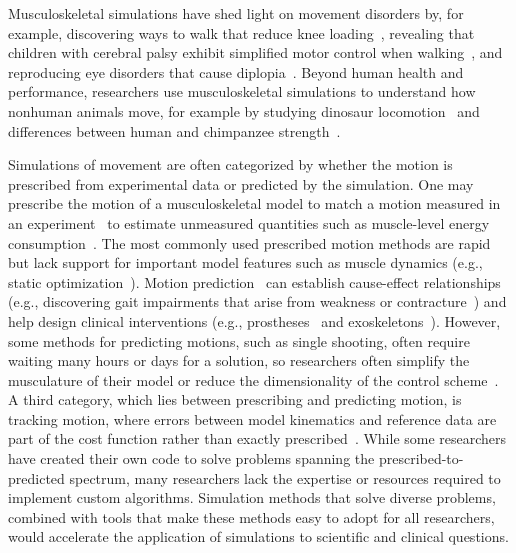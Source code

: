 \documentclass[10pt,letterpaper]{article}
\begin{document}
Musculoskeletal simulations have shed light on movement disorders by, for example, discovering ways to walk that reduce knee loading~\cite{Fregly:2007ac}, revealing that children with cerebral palsy exhibit simplified motor control when walking~\cite{Steele:2015}, and reproducing eye disorders that cause diplopia~\cite{Priamikov:2016}. Beyond human health and performance, researchers use musculoskeletal simulations to understand how nonhuman animals move, for example by studying dinosaur locomotion~\cite{sthaya:2005uk} and differences between human and chimpanzee strength~\cite{ONeill:2017}.

Simulations of movement are often categorized by whether the motion is prescribed from experimental data or predicted by the simulation. One may prescribe the motion of a musculoskeletal model to match a motion measured in an experiment~\cite{Thelen:2003bba,Lloyd:2003} to estimate unmeasured quantities such as muscle-level energy consumption~\cite{Farris:2014du,Jackson:2017go}. The most commonly used prescribed motion methods are rapid but lack support for important model features such as muscle dynamics (e.g., static optimization~\cite{Prilutsky:2002}).
Motion prediction~\cite{Geijtenbeek:2019} can establish cause-effect relationships (e.g., discovering gait impairments that arise from weakness or contracture~\cite{Ong:2019}) and help design clinical interventions (e.g., prostheses~\cite{Handford:2016kd} and exoskeletons~\cite{Millard:2017}).
However, some methods for predicting motions, such as single shooting,  often require waiting many hours or days for a solution, so researchers often simplify the musculature of their model or reduce the dimensionality of the control scheme~\cite{Anderson:2001gv,Ong:2019}.
A third category, which lies between prescribing and predicting motion, is tracking motion, where errors between model kinematics and reference data are part of the cost function rather than exactly prescribed~\cite{Lin:2017jp}.
While some researchers have created their own code to solve problems spanning the prescribed-to-predicted spectrum, many researchers lack the expertise or resources required to implement custom algorithms.
Simulation methods that solve diverse problems, combined with tools that make these methods easy to adopt for all researchers, would accelerate the application of simulations to scientific and clinical questions.
\end{document}
